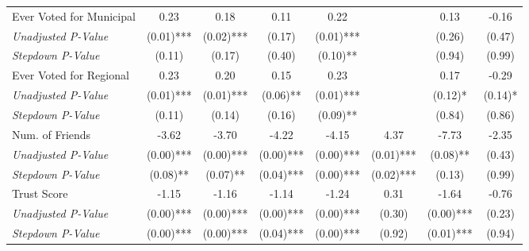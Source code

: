 \begin{tabular}{l c c c c c c c}
Ever Voted for Municipal & 0.23 & 0.18 & 0.11 & 0.22 & & 0.13 & -0.16 \\
\quad \textit{Unadjusted P-Value} & (0.01)*** & (0.02)*** & (0.17) & (0.01)*** & & (0.26) & (0.47) \\
\quad \textit{Stepdown P-Value} & (0.11) & (0.17) & (0.40) & (0.10)** & & (0.94) & (0.99) \\
Ever Voted for Regional & 0.23 & 0.20 & 0.15 & 0.23 & & 0.17 & -0.29 \\
\quad \textit{Unadjusted P-Value} & (0.01)*** & (0.01)*** & (0.06)** & (0.01)*** & & (0.12)* & (0.14)* \\
\quad \textit{Stepdown P-Value} & (0.11) & (0.14) & (0.16) & (0.09)** & & (0.84) & (0.86) \\
Num. of Friends & -3.62 & -3.70 & -4.22 & -4.15 & 4.37 & -7.73 & -2.35 \\
\quad \textit{Unadjusted P-Value} & (0.00)*** & (0.00)*** & (0.00)*** & (0.00)*** & (0.01)*** & (0.08)** & (0.43) \\
\quad \textit{Stepdown P-Value} & (0.08)** & (0.07)** & (0.04)*** & (0.00)*** & (0.02)*** & (0.13) & (0.99) \\
Trust Score & -1.15 & -1.16 & -1.14 & -1.24 & 0.31 & -1.64 & -0.76 \\
\quad \textit{Unadjusted P-Value} & (0.00)*** & (0.00)*** & (0.00)*** & (0.00)*** & (0.30) & (0.00)*** & (0.23) \\
\quad \textit{Stepdown P-Value} & (0.00)*** & (0.00)*** & (0.04)*** & (0.00)*** & (0.92) & (0.01)*** & (0.94) \\
\bottomrule
\end{tabular}
